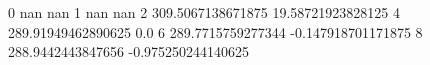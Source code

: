 0 nan nan
1 nan nan
2 309.5067138671875 19.58721923828125
4 289.91949462890625 0.0
6 289.7715759277344 -0.147918701171875
8 288.9442443847656 -0.975250244140625
